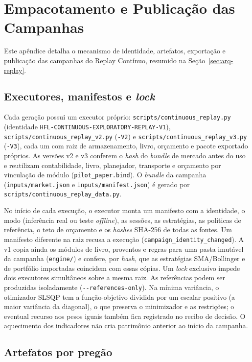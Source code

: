 \chapter{Empacotamento e Publicação das Campanhas}
\label{ap:empacotamento}

Este apêndice detalha o mecanismo de identidade, artefatos, exportação e publicação das campanhas do Replay Contínuo, resumido na Seção~\ref{sec:arq-replay}.

\section{Executores, manifestos e \textit{lock}}

Cada geração possui um executor próprio: \texttt{scripts/continuous\_replay.py} (identidade \texttt{HFL-CONTINUOUS-EXPLORATORY-REPLAY-V1}), \texttt{scripts/continuous\_replay\_v2.py} (\texttt{-V2}) e \texttt{scripts/continuous\_replay\_v3.py} (\texttt{-V3}), cada um com raiz de armazenamento, livro, orçamento e pacote exportado próprios. As versões v2 e v3 conferem o \textit{hash} do \textit{bundle} de mercado antes do uso e reutilizam contabilidade, livro, planejador, transporte e orçamento por vinculação de módulo (\texttt{pilot\_paper.bind}). O \textit{bundle} da campanha (\texttt{inputs/market.json} e \texttt{inputs/manifest.json}) é gerado por \texttt{scripts/continuous\_replay\_data.py}.

No início de cada execução, o executor monta um manifesto com a identidade, o modo (inferência real ou teste \textit{offline}), as sessões, as estratégias, as políticas de referência, o teto de orçamento e os \textit{hashes} SHA-256 de todas as fontes. Um manifesto diferente na raiz recusa a execução (\texttt{campaign\_identity\_changed}). A v1 copia ainda os módulos de livro, proventos e regras para uma pasta imutável da campanha (\texttt{engine/}) e confere, por \textit{hash}, que as estratégias SMA/Bollinger e de portfólio importadas coincidem com essas cópias. Um \textit{lock} exclusivo impede dois executores simultâneos sobre a mesma raiz. As referências podem ser produzidas isoladamente (\texttt{-{}-references-only}). Na mínima variância, o otimizador SLSQP tem a função-objetivo dividida por um escalar positivo (a maior variância da diagonal), o que preserva o minimizador e as restrições; o eventual recurso aos pesos iguais também fica registrado no recibo de decisão. O aquecimento dos indicadores não cria patrimônio anterior ao início da campanha.

\section{Artefatos por pregão}

